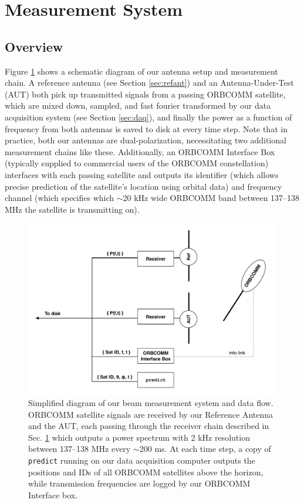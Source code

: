 \section{Measurement System}
\label{sec:measurementsystem}

\subsection{Overview}

Figure \ref{fig:systemoverviewdiagram} shows a schematic diagram of our antenna setup and measurement chain. A reference antenna (see Section \ref{sec:refant}) and an Antenna-Under-Test (AUT) both pick up transmitted signals from a passing ORBCOMM satellite, which are mixed down, sampled, and fast fourier transformed by our data acquisition system (see Section \ref{sec:daq}), and finally the power as a function of frequency from both antennas is saved to disk at every time step. Note that in practice, both our antennas are dual-polarization, necessitating two additional measurement chains like these. Additionally, an ORBCOMM Interface Box (typically supplied to commercial users of the ORBCOMM constellation) interfaces with each passing satellite and outputs its identifier (which allows precise prediction of the satellite's location using orbital data) and frequency channel (which specifies which $\sim$20 kHz wide ORBCOMM band between 137--138 MHz the satellite is transmitting on). 

\begin{figure}
\includegraphics[width=7in]{chap1_precision_beammapping_figures/system_overview_diagram.pdf}
\caption[Simplified diagram of our beam measurement system and data flow.]{Simplified diagram of our beam measurement system and data flow. ORBCOMM satellite signals are received by our Reference Antenna and the AUT, each passing through the receiver chain described in Sec. \ref{sec:measurementsystem} which outputs a power spectrum with 2 kHz resolution between 137--138 MHz every $\sim$200 ms. At each time step, a copy of {\tt predict} running on our data acquisition computer outputs the positions and IDs of all ORBCOMM satellites above the horizon, while transmission frequencies are logged by our ORBCOMM Interface box. }
\label{fig:systemoverviewdiagram}
\end{figure}

